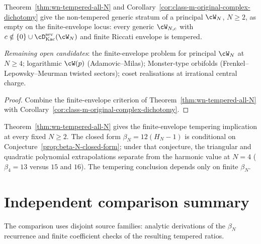 \begin{corollary}
\label{cor:wn-original-complex-dichotomy-healed}
\ClaimStatusConditional
Theorem~\ref{thm:wn-tempered-all-N} and
Corollary~\ref{cor:class-m-original-complex-dichotomy} give the
non-tempered generic stratum of a principal $\cW_N$, $N \ge 2$, as
empty on the finite-envelope locus: every generic $\cW_{N,c}$ with
$c \notin \{0\} \cup \cD^{\mathrm{sev}}_{\mathrm{Kac}}(\cW_N)$ and
finite Riccati envelope is tempered.

\emph{Remaining open candidates}: the finite-envelope problem for
principal $\cW_N$ at $N\ge4$; logarithmic $\cW(p)$ (Adamovic--Milas);
Monster-type orbifolds (Frenkel--Lepowsky--Meurman twisted sectors);
coset realisations at irrational central charge.
\end{corollary}

\begin{proof}
Combine the finite-envelope criterion of
Theorem~\ref{thm:wn-tempered-all-N} with
Corollary~\ref{cor:class-m-original-complex-dichotomy}.
\end{proof}

\begin{remark}
\label{rem:wn-harmonic-beta-law}
Theorem~\ref{thm:wn-tempered-all-N} gives the finite-envelope
tempering implication at every fixed $N \ge 2$. The closed form
$\beta_N = 12(H_N - 1)$ is conditional on
Conjecture~\ref{prop:beta-N-closed-form}; under that conjecture, the
triangular and quadratic polynomial extrapolations separate from the
harmonic value at $N = 4$ ($\beta_4=13$ versus $15$ and $16$). The
tempering conclusion depends only on finite $\beta_N$.
\end{remark}

\section{Independent comparison summary}
\label{sec:wn-tempered-closure-iv-summary}

The comparison uses disjoint source families: analytic derivations of
the $\beta_N$ recurrence and finite coefficient checks of the resulting
tempered ratios.

